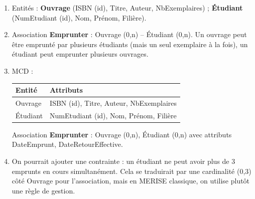 \begin{enumerate}
    \item Entités : \textbf{Ouvrage} (ISBN (id), Titre, Auteur, NbExemplaires) ; \textbf{Étudiant} (NumEtudiant (id), Nom, Prénom, Filière).
    \item Association \textbf{Emprunter} : Ouvrage (0,n) -- Étudiant (0,n). Un ouvrage peut être emprunté par plusieurs étudiants (mais un seul exemplaire à la fois), un étudiant peut emprunter plusieurs ouvrages.
    \item MCD :
    \begin{center}
    \begin{tabular}{|l|l|}
    \hline
    \textbf{Entité} & \textbf{Attributs} \\
    \hline
    Ouvrage & ISBN (id), Titre, Auteur, NbExemplaires \\
    \hline
    Étudiant & NumEtudiant (id), Nom, Prénom, Filière \\
    \hline
    \end{tabular}
    \end{center}
    Association \textbf{Emprunter} : Ouvrage (0,n), Étudiant (0,n) avec attributs DateEmprunt, DateRetourEffective.
    \item On pourrait ajouter une contrainte : un étudiant ne peut avoir plus de 3 emprunts en cours simultanément. Cela se traduirait par une cardinalité (0,3) côté Ouvrage pour l'association, mais en MERISE classique, on utilise plutôt une règle de gestion.
\end{enumerate}

